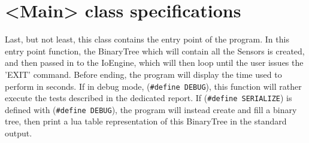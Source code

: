 \documentclass[10pt]{article}
\begin{document}
\section{<Main> class specifications}
Last, but not least, this class contains the entry point of the program. In this entry point function, the BinaryTree which will contain all the Sensors is created, and then passed in to the IoEngine, which will then loop until the user issues the 'EXIT' command. Before ending, the program will display the time used to perform in seconds.
If in debug mode, (\texttt{\#define DEBUG}), this function will rather execute the tests described in the dedicated report. If (\texttt{\#define SERIALIZE}) is defined with  (\texttt{\#define DEBUG}), the program will instead create and fill a binary tree, then print a lua table representation of this BinaryTree in the standard output.
\end{document}
